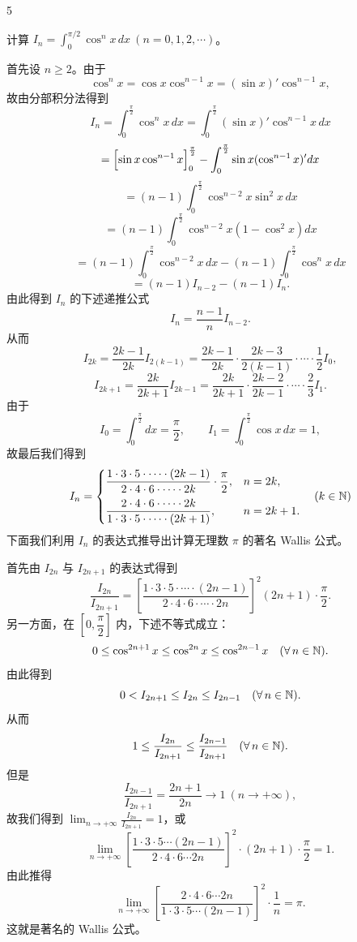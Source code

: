 \begin{sourceexample}{5}

	计算 \(I_n=\displaystyle\int_0^{\pi/2}\cos^nx\,dx\ (n=0,1,2,\cdots)\)。

	首先设 \(n\ge2\)。由于
	\[
	\cos^nx=\cos x\cos^{n-1}x=(\sin x)'\cos^{n-1}x,
	\]
	故由分部积分法得到
	\[
	I_n=\int_0^{\frac\pi2}\cos^nx\,dx=\int_0^{\frac\pi2}(\sin x)'\cos^{n-1}x\,dx
	\]
	\[
	=\Bigl[\sin x\cos^{n-1}x\Bigr]_0^{\frac\pi2}-\int_0^{\frac\pi2}\sin x(\cos^{n-1}x)'dx
	\]
	\[
	=(n-1)\int_0^{\frac\pi2}\cos^{n-2}x\sin^2x\,dx
	\]
	\[
	=(n-1)\int_0^{\frac\pi2}\cos^{n-2}x(1-\cos^2x)dx
	\]
	\[
	=(n-1)\int_0^{\frac\pi2}\cos^{n-2}x\,dx-(n-1)\int_0^{\frac\pi2}\cos^nx\,dx
	\]
	\[
	=(n-1)I_{n-2}-(n-1)I_n.
	\]
	由此得到 \(I_n\) 的下述递推公式
	\[
	I_n=\frac{n-1}{n}I_{n-2}.
	\]
	从而
	\[
	I_{2k}=\frac{2k-1}{2k}I_{2(k-1)}=\frac{2k-1}{2k}\cdot\frac{2k-3}{2(k-1)}\cdot\cdots\cdot\frac12 I_0,
	\]
	\[
	I_{2k+1}=\frac{2k}{2k+1}I_{2k-1}=\frac{2k}{2k+1}\cdot\frac{2k-2}{2k-1}\cdot\cdots\cdot\frac23 I_1.
	\]
	由于
	\[
	I_0=\int_0^{\frac\pi2}dx=\frac\pi2,\qquad I_1=\int_0^{\frac\pi2}\cos x\,dx=1,
	\]
	故最后我们得到
	\[
	I_n=\begin{cases} \dfrac{1\cdot3\cdot5\cdot\cdots\cdot(2k-1)}{2\cdot4\cdot6\cdot\cdots\cdot2k}\cdot\dfrac\pi2, & n=2k, \\[8pt] \dfrac{2\cdot4\cdot6\cdot\cdots\cdot2k}{1\cdot3\cdot5\cdot\cdots\cdot(2k+1)}, & n=2k+1. \end{cases}\quad(k\in\mathbb{N})
	\]
	下面我们利用 \(I_n\) 的表达式推导出计算无理数 \(\pi\) 的著名 Wallis 公式。

	首先由 \(I_{2n}\) 与 \(I_{2n+1}\) 的表达式得到
	\[
	\frac{I_{2n}}{I_{2n+1}}=\left[\frac{1\cdot3\cdot5\cdot\cdots\cdot(2n-1)}{2\cdot4\cdot6\cdot\cdots\cdot2n}\right]^2(2n+1)\cdot\frac\pi2.
	\]
	另一方面，在 \(\left[0,\dfrac\pi2\right]\) 内，下述不等式成立：
	\[
	0\le\cos^{2n+1}x\le\cos^{2n}x\le\cos^{2n-1}x\quad(\forall\,n\in\mathbb{N}).
	\]
	由此得到
	\[
	0<I_{2n+1}\le I_{2n}\le I_{2n-1}\quad(\forall\,n\in\mathbb{N}).
	\]
	从而
	\[
	1\le\frac{I_{2n}}{I_{2n+1}}\le\frac{I_{2n-1}}{I_{2n+1}}\quad(\forall\,n\in\mathbb{N}).
	\]
	但是
	\[
	\frac{I_{2n-1}}{I_{2n+1}}=\frac{2n+1}{2n}\to1\ (n\to+\infty),
	\]
	故我们得到 \(\displaystyle\lim_{n\to+\infty}\frac{I_{2n}}{I_{2n+1}}=1\)，或
	\[
	\lim_{n\to+\infty}\left[\frac{1\cdot3\cdot5\cdots(2n-1)}{2\cdot4\cdot6\cdots2n}\right]^2\cdot(2n+1)\cdot\frac\pi2=1.
	\]
	由此推得
	\[
	\lim_{n\to+\infty}\left[\frac{2\cdot4\cdot6\cdots2n}{1\cdot3\cdot5\cdots(2n-1)}\right]^2\cdot\frac1n=\pi.
	\]
	这就是著名的 Wallis 公式。

\end{sourceexample}

